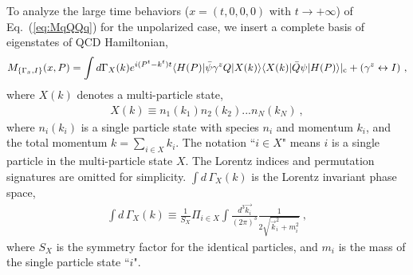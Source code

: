 \documentclass[a4paper,11pt]{article}
\begin{document}
To analyze the large time behaviors ($x=(t,0,0,0)$ with $t\rightarrow +\infty$) of Eq.~(\ref{eq:MqQQq}) for the unpolarized case, we insert a complete basis of eigenstates of QCD Hamiltonian,
\begin{align}\label{eq:FFrep}
M_{\{\Gamma_x,I\}}(x,P)  = \int d \Gamma_{X}(k) e^{i (P^t-k^t) t}  \langle H(P) | \bar{\psi} \gamma^z Q |X(k)\rangle \langle X(k)| \bar{Q}  \psi | H(P) \rangle |_{\rm c} + (\gamma^z \leftrightarrow I) \ ,
\end{align}
where $X(k)$ denotes a multi-particle state,
\begin{align}\label{eq:Xmps}
X(k) \equiv  n_1(k_1) n_2(k_2) ... n_N(k_N)\ ,
\end{align}
where $n_i(k_i)$ is a single particle state with species $n_i$ and momentum $k_i$, and the total momentum $k=\sum_{i \in X} k_{i}$. The notation ``$i \in X$" means $i$ is a single particle in the multi-particle state $X$. The Lorentz indices and permutation signatures are omitted for simplicity. $\int d \, \Gamma_X(k)$ is the Lorentz invariant phase space,
\begin{align}\label{eq:PhaseSpace}
\int d \, \Gamma_X(k) \equiv \frac{1}{S_X} \Pi_{i \in X} \int \frac{d^3 \vec{k_i}}{(2\pi)^3} \frac{1}{2\sqrt{\vec{k}_{i}^2+m_{i}^2}} \ ,
\end{align}
where $S_X$ is the symmetry factor for the identical particles, and $m_{i}$ is the mass of the single particle state ``$i$". 
\end{document}
